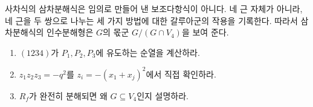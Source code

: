 \begin{keyidea}
사차식의 삼차분해식은 임의로 만들어 낸 보조다항식이 아니다. 네 근 자체가 아니라, 네 근을 두 쌍으로 나누는 세 가지 방법에 대한 갈루아군의 작용을 기록한다. 따라서 삼차분해식의 인수분해형은 $G$의 몫군 $G/(G\cap V_4)$을 보여 준다.
\end{keyidea}

\begin{checkpoint}
\begin{enumerate}[label=(\alph*)]
  \item $(1234)$가 $P_1,P_2,P_3$에 유도하는 순열을 계산하라.
  \item $z_1z_2z_3=-q^2$를 $z_i=-(x_1+x_j)^2$에서 직접 확인하라.
  \item $R_f$가 완전히 분해되면 왜 $G\subseteq V_4$인지 설명하라.
\end{enumerate}
\end{checkpoint}
